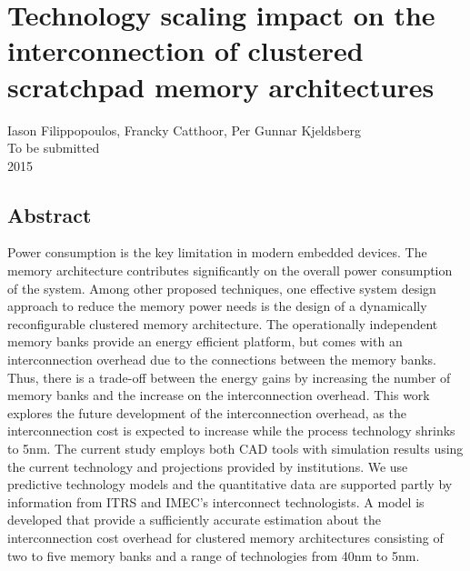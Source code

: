 
%


\chapter{Technology scaling impact on the interconnection of clustered scratchpad memory architectures}
\label{interconnection}

\begin{center}
Iason Filippopoulos, Francky Catthoor, Per Gunnar Kjeldsberg
\\
To be submitted
\\
2015
\end{center}
\afterpage{\null\newpage}
\newpage

\vspace*{\fill}
\section*{\hspace*{\fill} Abstract \hspace*{\fill}}
Power consumption is the key limitation in modern embedded devices.
The memory architecture contributes significantly on the overall power consumption of the system.
Among other proposed techniques, one effective system design approach to reduce the memory power needs is the design of a dynamically reconfigurable clustered memory architecture.
The operationally independent memory banks provide an energy efficient platform, but comes with an interconnection overhead due to the connections between the memory banks. 
Thus, there is a trade-off between the energy gains by increasing the number of memory banks and the increase on the interconnection overhead.
This work explores the future development of the interconnection overhead, as the interconnection cost is expected to increase while the process technology shrinks to 5nm.
The current study employs both CAD tools with simulation results using the current technology and projections provided by institutions.
We use predictive technology models and the quantitative data are supported partly by information
from ITRS and IMEC's interconnect technologists.
A model is developed that provide a sufficiently accurate estimation about the interconnection cost overhead for clustered memory architectures consisting of two to five memory banks and a range of technologies from 40nm to 5nm.  
\vspace*{\fill}
\afterpage{\null\newpage}
\newpage

